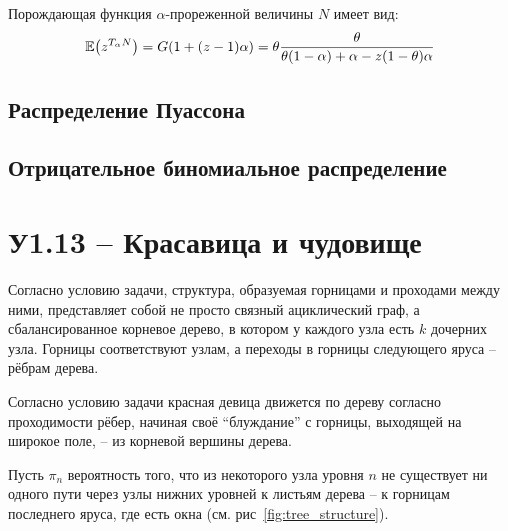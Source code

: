 \documentclass[a4paper]{article}
\let\originalleft\left
\let\originalright\right
\renewcommand{\left}{\mathopen{}\mathclose\bgroup\originalleft}
\renewcommand{\right}{\aftergroup\egroup\originalright}
\newcommand{\brac}[1]{{\left ( #1 \right )}}
\newcommand{\Ex}[0]{{\mathbb{E}}}
\begin{document}
Порождающая функция $\alpha$-прореженной величины $N$ имеет вид:
\[ \Ex\brac{z^{T_\alpha N}} = G\brac{1 + (z-1) \alpha} = \theta \frac{\theta}{\theta (1-\alpha) + \alpha - z (1-\theta)\alpha }\]


\subsection{Распределение Пуассона} %
\label{sub:Poisson_distribution}



\subsection{Отрицательное биномиальное распределение} %
\label{sub:negative_binomial}





\section{У1.13 -- Красавица и чудовище} %
\label{sec:task_1_13}

Согласно условию задачи, структура, образуемая горницами и проходами
между ними, представляет собой не просто связный ациклический граф, а
сбалансированное корневое дерево, в котором у каждого узла есть $k$
дочерних узла.
Горницы соответствуют узлам, а переходы в горницы следующего яруса
-- рёбрам дерева.

Согласно условию задачи красная девица движется по дереву согласно
проходимости рёбер, начиная своё ``блуждание'' с горницы, выходящей на
широкое поле, -- из корневой вершины дерева.

Пусть $\pi_n$ вероятность того, что из некоторого узла уровня $n$
не существует ни одного пути через узлы нижних уровней к листьям дерева
-- к горницам последнего яруса, где есть окна (см. рис~\ref{fig:tree_structure}).
\end{document}
